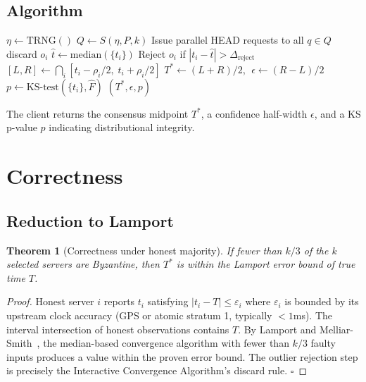 \documentclass[11pt,twocolumn]{article}
\newtheorem{theorem}{Theorem}
\begin{document}
\subsection{Algorithm}

\begin{algorithm}
\caption{\textsc{nunc} time establishment}
\begin{algorithmic}[1]
  \State $\eta \leftarrow \mathrm{TRNG}()$
  \State $Q \leftarrow S(\eta, P, k)$
  \State Issue parallel HEAD requests to all $q \in Q$
     discard $o_i$ \EndIf
  \EndFor
  \State $\hat{t} \leftarrow \mathrm{median}(\{t_i\})$
  \State Reject $o_i$ if $|t_i - \hat{t}| > \Delta_{\mathrm{reject}}$
  \State $[L, R] \leftarrow \bigcap_i [t_i - \rho_i/2,\; t_i + \rho_i/2]$
  \State $T^* \leftarrow (L+R)/2$, $\;\epsilon \leftarrow (R-L)/2$
  \State $p \leftarrow \mathrm{KS\text{-}test}(\{t_i\}, \hat{F})$
  \State \Return $(T^*, \epsilon, p)$
\end{algorithmic}
\end{algorithm}

The client returns the consensus midpoint $T^*$, a confidence half-width
$\epsilon$, and a KS p-value $p$ indicating distributional integrity.

\section{Correctness}

\subsection{Reduction to Lamport}

\begin{theorem}[Correctness under honest majority]
  If fewer than $k/3$ of the $k$ selected servers are Byzantine, then $T^*$
  is within the Lamport error bound of true time $T$.
\end{theorem}

\begin{proof}
  Honest server $i$ reports $t_i$ satisfying $|t_i - T| \leq \varepsilon_i$
  where $\varepsilon_i$ is bounded by its upstream clock accuracy (GPS or
  atomic stratum 1, typically $<1$ms).  The interval intersection of honest
  observations contains $T$.  By Lamport and
  Melliar-Smith~\cite{lamport1984}, the median-based convergence algorithm
  with fewer than $k/3$ faulty inputs produces a value within the proven
  error bound.  The outlier rejection step is precisely the Interactive
  Convergence Algorithm's discard rule.  $\square$
\end{proof}
\end{document}
